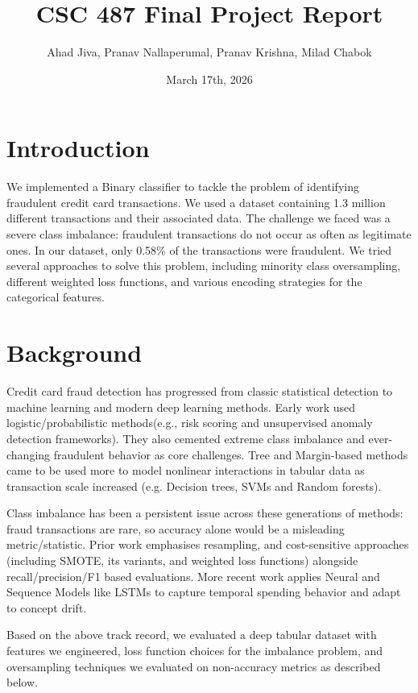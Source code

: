 \documentclass{article}
\title{CSC 487 Final Project Report}
\author{Ahad Jiva, Pranav Nallaperumal, Pranav Krishna, Milad Chabok}
\date{March 17th, 2026}
\begin{document}
\maketitle

\section{Introduction}

We implemented a Binary classifier to tackle the problem of identifying fraudulent credit card transactions. We used a dataset containing 1.3 million different transactions and their associated data. The challenge we faced was a severe class imbalance: fraudulent transactions do not occur as often as legitimate ones. In our dataset, only 0.58\% of the transactions were fraudulent. We tried several approaches to solve this problem, including minority class oversampling, different weighted loss functions, and various encoding strategies for the categorical features.

\section{Background}

Credit card fraud detection has progressed from classic statistical detection to machine learning and modern deep learning methods. Early work used logistic/probabilistic methods(e.g., risk scoring and unsupervised anomaly detection frameworks). They also cemented extreme class imbalance and ever-changing fraudulent behavior as core challenges. Tree and Margin-based methods came to be used more to model nonlinear interactions in tabular data as transaction scale increased (e.g. Decision trees, SVMs and Random forests).

Class imbalance has been a persistent issue across these generations of methods: fraud transactions are rare, so accuracy alone would be a misleading metric/statistic. Prior work emphasises resampling, and cost-sensitive approaches (including SMOTE, its variants, and weighted loss functions) alongside recall/precision/F1 based evaluations. More recent work applies Neural and Sequence Models like LSTMs to capture temporal spending behavior and adapt to concept drift.

Based on the above track record, we evaluated a deep tabular dataset with features we engineered, loss function choices for the imbalance problem, and oversampling techniques we evaluated on non-accuracy metrics as described below.
\end{document}
